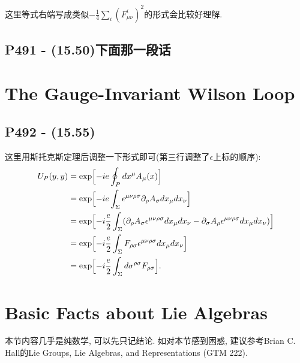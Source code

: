 这里等式右端写成类似$-\frac{1}{4}\sum_{i}(F^i_{\mu\nu})^2$的形式会比较好理解.

\subsection{P491 - (15.50)下面那一段话}


\section{The Gauge-Invariant Wilson Loop}

\subsection{P492 - (15.55)}

这里用斯托克斯定理后调整一下形式即可(第三行调整了$\epsilon$上标的顺序):
\begin{equation}
  \begin{aligned}
    U_P(y, y) & = \exp\Bigl[ -ie \oint_P dx^{\mu} A_{\mu}(x) \Bigr]                                                                                                                                                \\
              & = \exp\Bigl[ -ie \int_{\Sigma} \epsilon^{\mu\nu\rho\sigma}\partial_{\rho} A_{\sigma} dx_{\mu}dx_{\nu}\Bigr]                                                                                        \\
              & = \exp\Bigl[ -i\frac{e}{2} \int_{\Sigma} (\partial_{\rho} A_{\sigma} \epsilon^{\mu\nu\rho\sigma} dx_{\mu}dx_{\nu} - \partial_{\sigma} A_{\rho} \epsilon^{\mu\nu\rho\sigma} dx_{\mu}dx_{\nu})\Bigr] \\
              & = \exp\Bigl[ -i\frac{e}{2} \int_{\Sigma} F_{\rho\sigma}\epsilon^{\mu\nu\rho\sigma} dx_{\mu}dx_{\nu}\Bigr]                                                                                          \\
              & = \exp\Bigl[ -i\frac{e}{2} \int_{\Sigma} d\sigma^{\rho\sigma} F_{\rho\sigma} \Bigr].
  \end{aligned}
\end{equation}

\section{Basic Facts about Lie Algebras}

本节内容几乎是纯数学, 可以先只记结论.
如对本节感到困惑, 建议参考Brian C. Hall的Lie Groups, Lie Algebras, and Representations (GTM 222).



